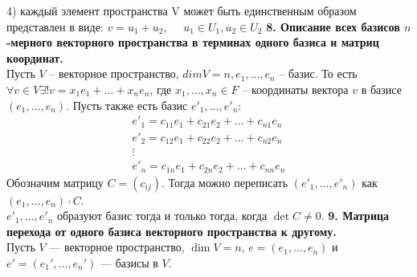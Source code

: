 \documentclass{article}
\begin{document}
4) каждый элемент пространства V может быть единственным образом представлен в виде: $v = u_1+u_2,~~~~~~u_1\in U_1, u_2 \in U_2$
\newline
\newline
\textbf{8. Описание всех базисов $n$-мерного векторного пространства в терминах одного базиса и матриц координат.}\\
   Пусть $V$ -- векторное пространство, $dim V = n, e_1, \dotso, e_n$ -- базис. То есть $\forall v \in V \exists! v = x_1e_1 + \dotso + x_ne_n$, где $x_1, \dotso, x_n \in F$ -- координаты вектора $v$ в базисе $(e_1,\dotso, e_n)$. Пусть также есть базис $e'_1,\dotso,e'_n$:
   \begin{gather*}
       e'_1 = c_{11}e_1 + c_{21}e_2 + \dotso + c_{n1}e_n \\
       e'_2 = c_{12}e_1 + c_{22}e_2 + \dotso + c_{n2}e_n \\
       \vdots \\
       e'_n = c_{1n}e_1 + c_{2n}e_2 + \dotso + c_{nn}e_n
   \end{gather*}
   Обозначим матрицу $C = (c_{ij})$. Тогда можно переписать $(e'_1,\dotso,e'_n)$ как $(e_1, \dotso, e_n)\cdot C$.\\ $e'_1, \dotso, e'_n$ образуют базис тогда и только тогда, когда $\det C \ne 0$.
\newline
\newline
\textbf{9. Матрица перехода от одного базиса векторного пространства к другому.}\\
Пусть $V$ --- векторное пространство, $\dim V = n$, $e = (e_1, \ldots, e_n)$ и $e' =(e_1', \ldots, e_n')$ --- базисы в $V$.
\end{document}
